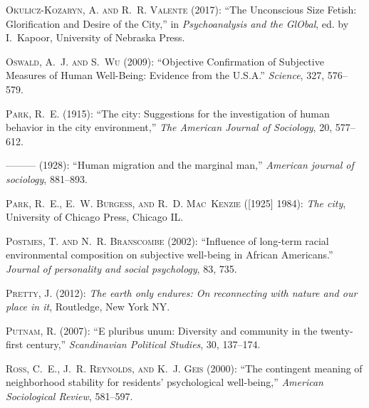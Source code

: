 \documentclass[10pt, letterpaper]{article}
\begin{document}
\begin{spacing}{2.0}
\begin{thebibliography}{115}
\textsc{Okulicz-Kozaryn, A. and R.~R. Valente} (2017): \enquote{The Unconscious
  Size Fetish: Glorification and Desire of the City,} in \emph{Psychoanalysis
  and the GlObal}, ed. by I.~Kapoor, University of Nebraska Press.

\textsc{Oswald, A.~J. and S.~Wu} (2009): \enquote{{Objective Confirmation of
  Subjective Measures of Human Well-Being: Evidence from the U.S.A.}}
  \emph{Science}, 327, 576--579.

\textsc{Park, R.~E.} (1915): \enquote{The city: Suggestions for the
  investigation of human behavior in the city environment,} \emph{The American
  Journal of Sociology}, 20, 577--612.

---\hspace{-.1pt}---\hspace{-.1pt}--- (1928): \enquote{Human migration and the
  marginal man,} \emph{American journal of sociology}, 881--893.

\textsc{Park, R.~E., E.~W. Burgess, and R.~D. Mac~Kenzie} ([1925] 1984):
  \emph{The city}, University of Chicago Press, Chicago IL.

\textsc{Postmes, T. and N.~R. Branscombe} (2002): \enquote{Influence of
  long-term racial environmental composition on subjective well-being in
  African Americans.} \emph{Journal of personality and social psychology}, 83,
  735.

\textsc{Pretty, J.} (2012): \emph{The earth only endures: On reconnecting with
  nature and our place in it}, Routledge, New York NY.

\textsc{Putnam, R.} (2007): \enquote{E pluribus unum: Diversity and community
  in the twenty-first century,} \emph{Scandinavian Political Studies}, 30,
  137--174.

\textsc{Ross, C.~E., J.~R. Reynolds, and K.~J. Geis} (2000): \enquote{The
  contingent meaning of neighborhood stability for residents' psychological
  well-being,} \emph{American Sociological Review}, 581--597.


\end{thebibliography}
\end{spacing}
\end{document}
